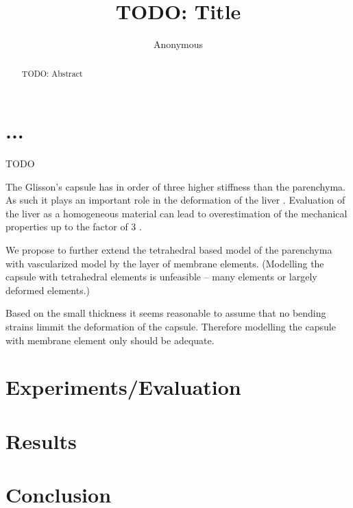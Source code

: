 \documentclass{llncs}
\begin{document}
%
%
\mainmatter              %
%
\title{TODO: Title} %
%
%
\author{Anonymous}
%
%
%
\maketitle

\begin{abstract}
TODO: Abstract
\end{abstract}

\section{...}

TODO

The Glisson's capsule \cite{Umale2013} has in order of three higher
stiffness than the parenchyma. As such it plays an important role in the
deformation of the liver \cite{Ahn2010,Hollenstein2006}. Evaluation of the
liver as a homogeneous material can lead to overestimation of the
mechanical properties up to the factor of 3 \cite{Hollenstein2006}.


We propose to further extend the tetrahedral based model of the parenchyma
with vascularized model \cite{Peterlik2012} by the layer of membrane elements.
(Modelling the capsule with tetrahedral elements is unfeasible -- many
elements or largely deformed elements.)

Based on the small thickness it seems reasonable to assume that no bending
strains limmit the deformation of the capsule. Therefore modelling the
capsule with membrane element only should be adequate.




\section{Experiments/Evaluation}

\section{Results}

\section{Conclusion}



%
%



\end{document}
